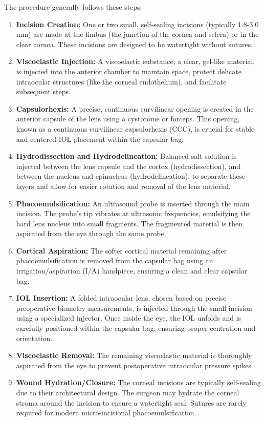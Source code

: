 The procedure generally follows these steps:

\begin{enumerate}
  \item \textbf{Incision Creation:} One or two small, self-sealing incisions (typically 1.8-3.0 mm) are made at the limbus (the junction of the cornea and sclera) or in the clear cornea. These incisions are designed to be watertight without sutures.
  \item \textbf{Viscoelastic Injection:} A viscoelastic substance, a clear, gel-like material, is injected into the anterior chamber to maintain space, protect delicate intraocular structures (like the corneal endothelium), and facilitate subsequent steps.
  \item \textbf{Capsulorhexis:} A precise, continuous curvilinear opening is created in the anterior capsule of the lens using a cystotome or forceps. This opening, known as a continuous curvilinear capsulorhexis (CCC), is crucial for stable and centered IOL placement within the capsular bag.
  \item \textbf{Hydrodissection and Hydrodelineation:} Balanced salt solution is injected between the lens capsule and the cortex (hydrodissection), and between the nucleus and epinucleus (hydrodelineation), to separate these layers and allow for easier rotation and removal of the lens material.
  \item \textbf{Phacoemulsification:} An ultrasound probe is inserted through the main incision. The probe's tip vibrates at ultrasonic frequencies, emulsifying the hard lens nucleus into small fragments. The fragmented material is then aspirated from the eye through the same probe.
  \item \textbf{Cortical Aspiration:} The softer cortical material remaining after phacoemulsification is removed from the capsular bag using an irrigation/aspiration (I/A) handpiece, ensuring a clean and clear capsular bag.
  \item \textbf{IOL Insertion:} A folded intraocular lens, chosen based on precise preoperative biometry measurements, is injected through the small incision using a specialized injector. Once inside the eye, the IOL unfolds and is carefully positioned within the capsular bag, ensuring proper centration and orientation.
  \item \textbf{Viscoelastic Removal:} The remaining viscoelastic material is thoroughly aspirated from the eye to prevent postoperative intraocular pressure spikes.
  \item \textbf{Wound Hydration/Closure:} The corneal incisions are typically self-sealing due to their architectural design. The surgeon may hydrate the corneal stroma around the incision to ensure a watertight seal. Sutures are rarely required for modern micro-incisional phacoemulsification.
\end{enumerate}

